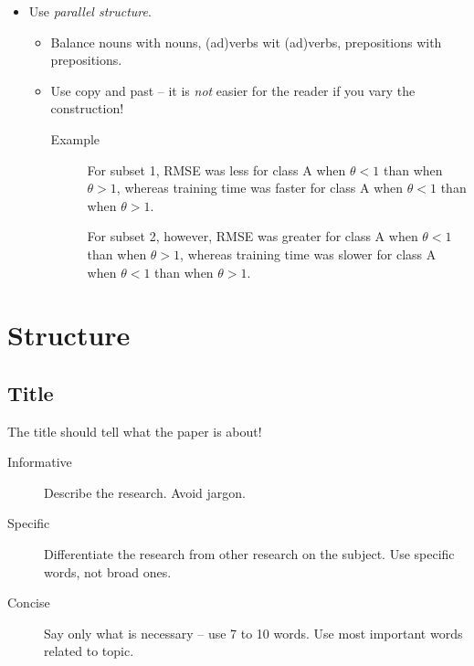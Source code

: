 \documentclass[10pt,a4paper,twocolumn]{scrartcl}
\begin{document}
\begin{itemize}
    \item Use \emph{parallel structure}.
        \begin{itemize}
            \item Balance nouns with nouns, (ad)verbs wit (ad)verbs, prepositions with prepositions.
            \item Use copy and past -- it is \emph{not} easier for the reader if you vary the construction!
                \begin{description}
                    \item[Example] For subset 1, RMSE {\color{blue!80}was} {\color{Green!80}less} {\color{BrickRed!80}for} class A {\color{Purple!80}when} $\theta < 1$ {\color{Green!80}than} {\color{Purple!80}when} $\theta > 1$, {\color{Orange!80}whereas} training time {\color{blue!80}was} {\color{Green!80}faster} {\color{BrickRed!80}for} class A {\color{Purple!80}when} $\theta < 1$ {\color{Green!80}than} {\color{Purple!80}when} $\theta > 1$.

                    For subset 2, {\color{Orange!80}however}, RMSE {\color{blue!80}was} {\color{Green!80}greater} {\color{BrickRed!80}for} class A {\color{Purple!80}when} $\theta < 1$ {\color{Green!80}than} {\color{Purple!80}when} $\theta > 1$, {\color{Orange!80}whereas} training time {\color{blue!80}was} {\color{Green!80}slower} {\color{BrickRed!80}for} class A {\color{Purple!80}when} $\theta < 1$ {\color{Green!80}than} {\color{Purple!80}when} $\theta > 1$.
                \end{description}
                
        \end{itemize}
        
\end{itemize}

\section{Structure}
\subsection{Title}
The title should tell what the paper is about!
\begin{description}
    \item[Informative] Describe the research. Avoid jargon.
    \item[Specific] Differentiate the research from other research on the subject. Use specific words, not broad ones.
    \item[Concise] Say only what is necessary -- use 7 to 10 words. Use most important words related to topic.
\end{description}
\end{document}
